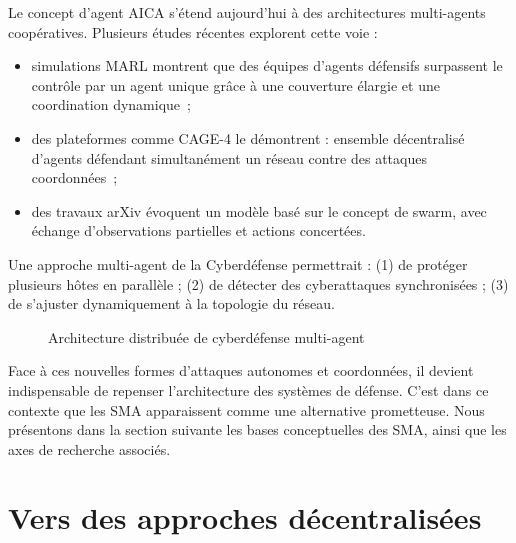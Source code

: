 \documentclass[ twoside,openright,titlepage,numbers=noenddot,headinclude,%
                footinclude=true,cleardoublepage=empty,abstractoff, %
                BCOR=5mm,paper=a4,fontsize=11pt,%
                french,american,%
                ]{scrreprt}
\begin{document}
Le concept d'agent AICA s'étend aujourd'hui à des architectures multi-agents coopératives. Plusieurs études récentes explorent cette voie :
\begin{itemize}
    \item simulations MARL montrent que des équipes d'agents défensifs surpassent le contrôle par un agent unique grâce à une couverture élargie et une coordination dynamique~\cite{RLResilientCyberdefense2024};
    \item des plateformes comme CAGE-4 le démontrent : ensemble décentralisé d'agents défendant simultanément un réseau contre des attaques coordonnées~\cite{cage_challenge_3_announcement};
    \item des travaux arXiv évoquent un modèle basé sur le concept de swarm, avec échange d'observations partielles et actions concertées.
\end{itemize}
Une approche multi-agent de la Cyberdéfense permettrait : (1) de protéger plusieurs hôtes en parallèle ; (2) de détecter des cyberattaques synchronisées ; (3) de s'ajuster dynamiquement à la topologie du réseau.

\begin{figure}[h]
    \centering
    \caption{Architecture distribuée de cyberdéfense multi-agent}
    \label{fig:distributed_sma}
\end{figure}

\noindent
Face à ces nouvelles formes d'attaques autonomes et coordonnées, il devient indispensable de repenser l'architecture des systèmes de défense. C'est dans ce contexte que les \ac{SMA} apparaissent comme une alternative prometteuse. Nous présentons dans la section suivante les bases conceptuelles des SMA, ainsi que les axes de recherche associés.

\section{Vers des approches décentralisées}\label{sec:sma-concepts}

\end{document}
